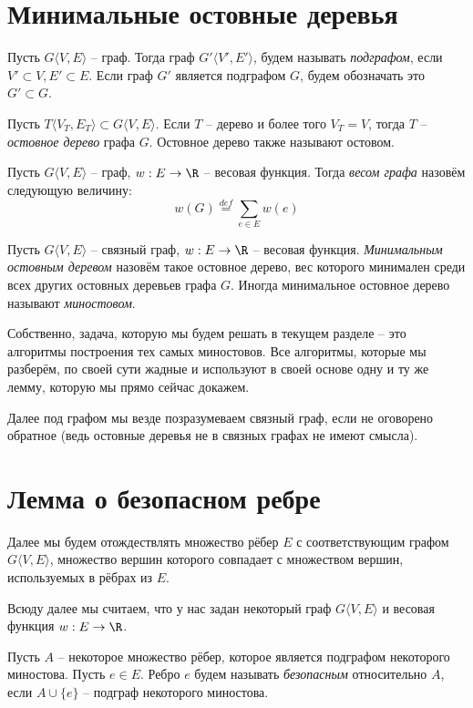 \section{Минимальные остовные деревья}

\Def Пусть $G \langle V, E \rangle$ -- граф. Тогда граф $G' \langle V', E' \rangle$, будем называть \textit{подграфом}, если $V' \subset V, E' \subset E$. Если граф $G'$ является подграфом $G$, будем обозначать это $G' \subset G$.

\Def Пусть $T\langle V_T, E_T \rangle \subset G\langle V, E \rangle$. Если $T$ -- дерево и более того $V_T = V$, тогда $T$ -- \textit{остовное дерево} графа $G$. Остовное дерево также называют остовом.

\Def Пусть $G \langle V, E \rangle$ -- граф, $w: E \to \R$ -- весовая функция. Тогда \textit{весом графа} назовём следующую величину:
\begin{equation*}
    w(G) \overset{def}{=} \sum\limits_{e \in E} w(e)
\end{equation*}

\Def Пусть $G \langle V, E \rangle$ -- связный граф, $w: E \to \R$ -- весовая функция. \textit{Минимальным остовным деревом} назовём такое остовное дерево, вес которого минимален среди всех других остовных деревьев графа $G$. Иногда минимальное остовное дерево называют \textit{миностовом}.

Собственно, задача, которую мы будем решать в текущем разделе -- это алгоритмы построения тех самых миностовов. 
Все алгоритмы, которые мы разберём, по своей сути жадные и используют в своей основе одну и ту же лемму, которую мы прямо сейчас докажем.

Далее под графом мы везде позразумеваем связный граф, если не оговорено обратное (ведь остовные деревья не в связных графах не имеют смысла).

\section{Лемма о безопасном ребре}

\Note Далее мы будем отождествлять множество рёбер $E$ с соответствующим графом $G \langle V, E \rangle$, множество вершин которого совпадает с множеством вершин, используемых в рёбрах из $E$.

Всюду далее мы считаем, что у нас задан некоторый граф $G \langle V, E \rangle$ и весовая функция $w: E \to \R$.

\Def Пусть $A$ -- некоторое множество рёбер, которое является подграфом некоторого миностова. Пусть $e \in E$. Ребро $e$ будем называть \textit{безопасным} относительно $A$, если $A \cup \{e\}$ -- подграф некоторого миностова.

